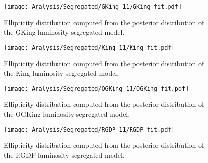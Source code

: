 \begin {figure}
 \centering
 \texttt{[image: Analysis/Segregated/GKing\_11/GKing\_fit.pdf]}
  \caption{Ellipticity distribution computed from the posterior distribution of the GKing luminosity segregated model.}
\label{fig:GKingSegEpsilon}
\end {figure}

\begin {figure}
 \centering
 \texttt{[image: Analysis/Segregated/King\_11/King\_fit.pdf]}
  \caption{Ellipticity distribution computed from the posterior distribution of the King luminosity segregated model.}
\label{fig:KingSegEpsilon}
\end {figure}

\begin {figure}
 \centering
 \texttt{[image: Analysis/Segregated/OGKing\_11/OGKing\_fit.pdf]}
  \caption{Ellipticity distribution computed from the posterior distribution of the OGKing luminosity segregated model.}
\label{fig:OGKingSegEpsilon}
\end {figure}

\begin {figure}
 \centering
 \texttt{[image: Analysis/Segregated/RGDP\_11/RGDP\_fit.pdf]}
  \caption{Ellipticity distribution computed from the posterior distribution of the RGDP luminosity segregated model.}
\label{fig:RGDPSegEpsilon}
\end {figure}





